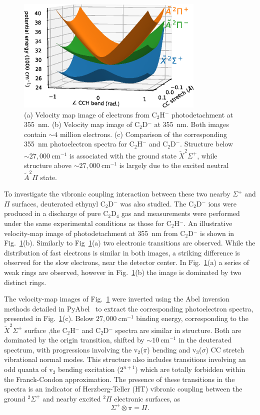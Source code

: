 \documentclass[aip,graphicx]{revtex4-1}
\begin{document}
\begin{figure}
	\includegraphics[width=0.8\textwidth]{figures/Fig1}
	\caption{(a) Velocity map image of electrons from C$_2$H$^-$ photodetachment at 355~nm. (b) Velocity map image of C$_2$D$^-$ at 355~nm. Both images contain $\sim4$ million electrons. (c) Comparison of the corresponding 355~nm photoelectron spectra for C$_2$H$^-$ and C$_2$D$^-$. Structure below $\sim 27,000~$cm$^{-1}$ is associated with the ground state $\tilde{X} ^2\Sigma^+$, while structure above  $\sim 27,000~$cm$^{-1}$ is largely due to the excited neutral $\tilde{A} ^2\Pi$ state.}
	\label{fig:1}
\end{figure}

To investigate the vibronic coupling interaction between these two nearby $\Sigma^+$ and $\Pi$ surfaces, deuterated ethynyl C$_2$D$^-$ was also studied. The C$_2$D$^-$ ions were produced in a discharge of pure C$_2$D$_4$ gas and measurements were performed under the same experimental conditions as those for C$_2$H$^-$. An illustrative velocity-map image of photodetachment at 355~nm from C$_2$D$^-$ is shown in Fig.~\ref{fig:1}(b). Similarly to Fig~\ref{fig:1}(a) two electronic transitions are observed. While the distribution of fast electrons is similar in both images, a striking difference is observed for the slow electrons, near the detector center. In Fig.~\ref{fig:1}(a) a series of weak rings are observed, however in Fig.~\ref{fig:1}(b) the image is dominated by two distinct rings.

The velocity-map images of Fig.~\ref{fig:1} were inverted using the Abel inversion methods detailed in PyAbel~\cite{hic19} to extract the corresponding photoelectron spectra, presented in Fig.~\ref{fig:1}(c). Below $27,000~$cm$^{-1}$ binding energy, corresponding to the $\tilde{X} ^2\Sigma^+$ surface ,the C$_2$H$^-$ and C$_2$D$^-$ spectra are similar in structure. Both are dominated by the origin transition, shifted by $\sim10~$cm$^{-1}$ in the deuterated spectrum, with progressions involving the v$_2$($\pi$) bending and v$_3$($\sigma$) CC stretch vibrational normal modes. This structure also includes transitions involving an odd quanta of v$_2$ bending excitation ($2^{n+1}$) which are totally forbidden within the Franck-Condon approximation. The presence of these transitions in the spectra is an indicator of Herzberg-Teller (HT) vibronic coupling between the ground $^2\Sigma^+$ and nearby excited $^2\Pi$ electronic surfaces, as
\begin{equation}
\Sigma^+ \otimes \pi = \Pi. 
\end{equation}
\end{document}

